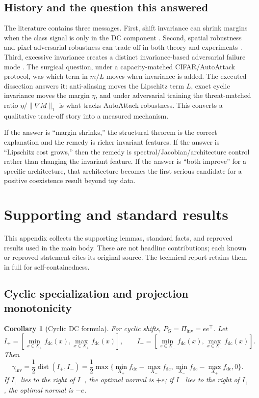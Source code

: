 \documentclass[11pt]{article}
\theoremstyle{plain}
\newtheorem{corollary}{Corollary}
\theoremstyle{definition}
\theoremstyle{remark}
\newcommand{\fdc}{f_{\mathrm{dc}}}
\newcommand{\Piinv}{\Pi_{\mathrm{inv}}}
\newcommand{\dist}{\operatorname{dist}}
\begin{document}
\subsection{History and the question this answered}
The literature contains three messages.  First, shift invariance can shrink margins when the class signal is only in the DC component \citep{Ge2021}.  Second, spatial robustness and pixel-adversarial robustness can trade off in both theory and experiments \citep{Kamath2021}.  Third, excessive invariance creates a distinct invariance-based adversarial failure mode \citep{Jacobsen2019,Tramer2020}.  The surgical question, under a capacity-matched CIFAR/AutoAttack protocol, was which term in $m/L$ moves when invariance is added.  The executed dissection answers it: anti-aliasing moves the Lipschitz term $L$, exact cyclic invariance moves the margin $\eta$, and under adversarial training the threat-matched ratio $\eta/\|\nabla M\|_1$ is what tracks AutoAttack robustness.  This converts a qualitative trade-off story into a measured mechanism.

If the answer is ``margin shrinks,'' the structural theorem is the correct explanation and the remedy is richer invariant features.  If the answer is ``Lipschitz cost grows,'' then the remedy is spectral/Jacobian/architecture control rather than changing the invariant feature.  If the answer is ``both improve'' for a specific architecture, that architecture becomes the first serious candidate for a positive coexistence result beyond toy data.

\appendix
\section{Supporting and standard results}\label{app:supporting}
This appendix collects the supporting lemmas, standard facts, and reproved results used in the main body.  These are not headline contributions; each known or reproved statement cites its original source.  The technical report retains them in full for self-containedness.

\subsection{Cyclic specialization and projection monotonicity}\label{app:cyclic-corollaries}

\begin{corollary}[Cyclic DC formula]\label{cor:cyclic-margin}
For cyclic shifts, $P_G=\Piinv=ee^\top$.  Let
\[
I_+=[\min_{x\in X_+}\fdc(x),\max_{x\in X_+}\fdc(x)],\qquad
I_-=[\min_{x\in X_-}\fdc(x),\max_{x\in X_-}\fdc(x)].
\]
Then
\[
\gamma_{\mathrm{inv}}=\frac12\dist(I_+,I_-)
=\frac12\max\Big\{
\min_{X_+}\fdc-\max_{X_-}\fdc,
\min_{X_-}\fdc-\max_{X_+}\fdc,
0
\Big\}.
\]
If $I_+$ lies to the right of $I_-$, the optimal normal is $+e$; if $I_-$ lies to the right of $I_+$, the optimal normal is $-e$.
\end{corollary}
\end{document}
